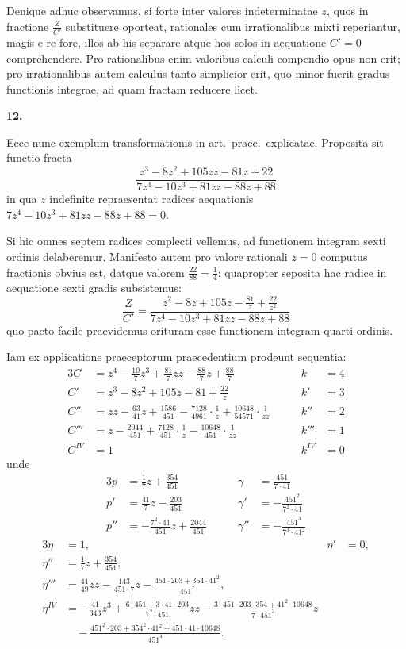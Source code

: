 \documentclass[12pt,a4paper]{article}
\newcommand{\art}[1]{\par\medskip\noindent\textbf{#1.}\par\nopagebreak\smallskip}
\begin{document}
Denique adhuc observamus, si forte inter valores indeterminatae $z$, quos in fractione $\frac{Z}{C'}$ substituere oporteat, rationales cum irrationalibus mixti reperiantur, magis e re fore, illos ab his separare atque hos solos in aequatione $C'=0$ comprehendere. Pro rationalibus enim valoribus calculi compendio opus non erit; pro irrationalibus autem calculus tanto simplicior erit, quo minor fuerit gradus functionis integrae, ad quam fractam reducere licet.

\art{12}

Ecce nunc exemplum transformationis in art.\ praec.\ explicatae. Proposita sit functio fracta
\[
\frac{z^3 - 8z^2 + 105zz - 81z + 22}{7z^4 - 10z^3 + 81zz - 88z + 88}
\]
in qua $z$ indefinite repraesentat radices aequationis $7z^4 - 10z^3 + 81zz - 88z + 88 = 0$.

Si hic omnes septem radices complecti vellemus, ad functionem integram sexti ordinis delaberemur. Manifesto autem pro valore rationali $z=0$ computus fractionis obvius est, datque valorem $\frac{22}{88}=\frac{1}{4}$: quapropter seposita hac radice in aequatione sexti gradis subsistemus:
\[
\frac{Z}{C'} = \frac{z^2 - 8z + 105z - \frac{81}{z} + \frac{22}{z^2}}{7z^4 - 10z^3 + 81zz - 88z + 88}
\]
quo pacto facile praevidemus orituram esse functionem integram quarti ordinis.

Iam ex applicatione praeceptorum praecedentium prodeunt sequentia:
\begin{alignat*}{3}
C &= z^4 - \tfrac{10}{7}z^3 + \tfrac{81}{7}zz - \tfrac{88}{7}z + \tfrac{88}{7} \qquad & k &= 4\\
C' &= z^3 - 8z^2 + 105z - 81 + \tfrac{22}{z} \qquad & k' &= 3\\
C'' &= zz - \tfrac{63}{41}z + \tfrac{1586}{451} - \tfrac{7128}{4961}\cdot\tfrac{1}{z} + \tfrac{10648}{54571}\cdot\tfrac{1}{zz} \qquad & k'' &= 2\\
C''' &= z - \tfrac{2044}{451} + \tfrac{7128}{451}\cdot\tfrac{1}{z} - \tfrac{10648}{451}\cdot\tfrac{1}{zz} \qquad & k''' &= 1\\
C^{IV} &= 1 \qquad & k^{IV} &= 0
\end{alignat*}
unde
\begin{alignat*}{3}
p &= \tfrac{1}{7}z + \tfrac{354}{451} \qquad & \gamma &= \tfrac{451}{7\cdot41}\\
p' &= \tfrac{41}{7}z - \tfrac{203}{451} \qquad & \gamma' &= -\tfrac{451^2}{7^2\cdot41}\\
p'' &= -\tfrac{7^2\cdot41}{451}z + \tfrac{2044}{451} \qquad & \gamma'' &= -\tfrac{451^3}{7^3\cdot41^2}
\end{alignat*}
\begin{alignat*}{3}
\eta &= 1, \qquad & \eta' &= 0,\\
\eta'' &= \tfrac{1}{7}z + \tfrac{354}{451},\\
\eta''' &= \tfrac{41}{49}zz - \tfrac{143}{451\cdot7}z - \tfrac{451\cdot203 + 354\cdot41^2}{451^2},\\
\eta^{IV} &= -\tfrac{41}{343}z^3 + \tfrac{6\cdot451 + 3\cdot41\cdot203}{7^2\cdot451}zz - \tfrac{3\cdot451\cdot203\cdot354 + 41^2\cdot10648}{7\cdot451^3}z\\
&\quad - \tfrac{451^2\cdot203 + 354^2\cdot41^2 + 451\cdot41\cdot10648}{451^4}.
\end{alignat*}
\end{document}
